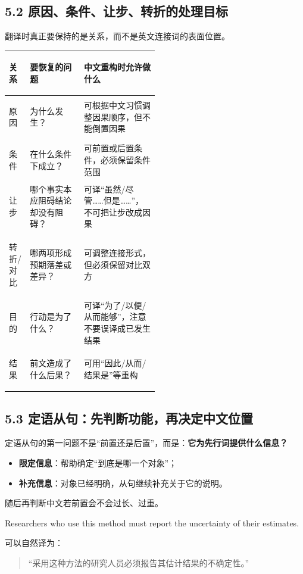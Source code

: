 \documentclass[11pt,a4paper]{ctexart}
\newcommand{\kw}[1]{\textbf{#1}}
\begin{document}
\subsection{5.2 原因、条件、让步、转折的处理目标}
翻译时真正要保持的是关系，而不是英文连接词的表面位置。

\begin{center}
\small
\begin{tabularx}{\linewidth}{>{\bfseries\raggedright\arraybackslash}p{0.14\linewidth} >{\raggedright\arraybackslash}p{0.36\linewidth} Y}
\toprule
关系 & 要恢复的问题 & 中文重构时允许做什么 \\
\midrule
原因 & 为什么发生？ & 可根据中文习惯调整因果顺序，但不能倒置因果 \\
条件 & 在什么条件下成立？ & 可前置或后置条件，必须保留条件范围 \\
让步 & 哪个事实本应阻碍结论却没有阻碍？ & 可译“虽然/尽管……但是……”，不可把让步改成因果 \\
转折/对比 & 哪两项形成预期落差或差异？ & 可调整连接形式，但必须保留对比双方 \\
目的 & 行动是为了什么？ & 可译“为了/以便/从而能够”，注意不要误译成已发生结果 \\
结果 & 前文造成了什么后果？ & 可用“因此/从而/结果是”等重构 \\
\bottomrule
\end{tabularx}
\end{center}

\subsection{5.3 定语从句：先判断功能，再决定中文位置}
定语从句的第一问题不是“前置还是后置”，而是：\kw{它为先行词提供什么信息？}

\begin{itemize}
  \item \kw{限定信息}：帮助确定“到底是哪一个对象”；
  \item \kw{补充信息}：对象已经明确，从句继续补充关于它的说明。
\end{itemize}

随后再判断中文若前置会不会过长、过重。

\begin{eng}[例 12：短限定信息]
Researchers who use this method must report the uncertainty of their estimates.
\end{eng}
可以自然译为：
\begin{quote}
“采用这种方法的研究人员必须报告其估计结果的不确定性。”
\end{quote}
\end{document}
